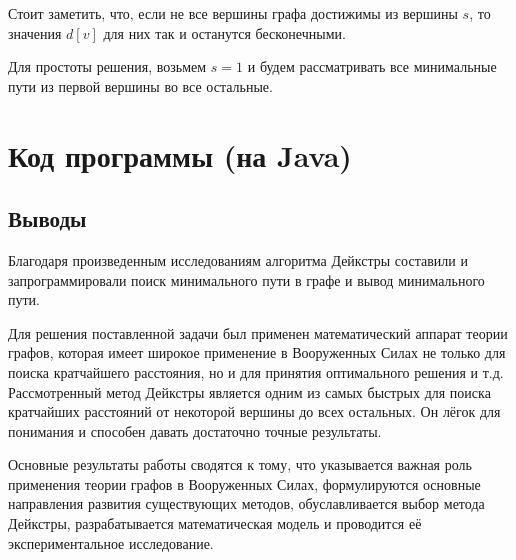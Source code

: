 \documentclass[12pt,a4paper]{scrartcl}
\begin{document}
Стоит заметить, что, если не все вершины графа достижимы из вершины $s$, то значения $d[v]$ для них так и останутся бесконечными.

Для простоты решения, возьмем $s = 1$ и будем рассматривать все минимальные пути из первой вершины во все остальные.

\section{Код программы (на Java)}



\subsection{Выводы}

Благодаря произведенным исследованиям алгоритма Дейкстры составили и запрограммировали поиск минимального пути в графе и вывод минимального пути. 

Для решения поставленной задачи был применен математический аппарат теории графов, которая имеет широкое применение в Вооруженных Силах не только для поиска кратчайшего расстояния, но и для принятия оптимального решения и т.д. Рассмотренный метод Дейкстры является одним из самых быстрых для поиска кратчайших расстояний от некоторой вершины до всех остальных. Он лёгок для понимания и способен давать достаточно точные результаты. 

Основные результаты работы сводятся к тому, что указывается важная роль применения теории графов в Вооруженных Силах, формулируются основные направления развития существующих методов, обуславливается выбор метода Дейкстры, разрабатывается математическая модель и проводится её экспериментальное исследование.
\end{document}
